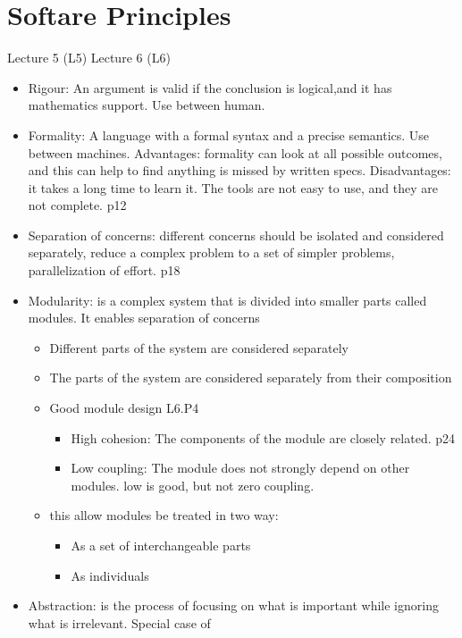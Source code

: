 \documentclass[12pt]{article}
\begin{document}
\section{Softare Principles}
Lecture 5 (L5)
Lecture 6 (L6)
\begin{itemize}
    \item Rigour: An argument is valid if the conclusion is logical,and it has mathematics support. Use between human.
    \item Formality: A language with a formal syntax and a precise semantics. Use between machines. 
    Advantages: formality can look at all possible outcomes, and this can help to find anything is missed by written specs.
    Disadvantages: it takes a long time to learn it. The tools are not easy to use, and they are not complete. p12
    \item Separation of concerns: different concerns should be isolated and considered separately, 
    reduce a complex problem to a set of simpler problems, parallelization of effort. p18
    \item Modularity: is a complex system that is divided into smaller parts called modules. It enables separation of concerns
    \begin{itemize}
        \item Different parts of the system are considered separately
        \item The parts of the system are considered separately from their composition
        \item Good module design L6.P4
        \begin{itemize}
            \item High cohesion: The components of the module are closely related. p24
            \item Low coupling: The module does not strongly depend on other modules. low is good, but not zero coupling.
        \end{itemize}
        \item this allow modules be treated in two way:
        \begin{itemize}
            \item As a set of interchangeable parts
            \item As individuals
        \end{itemize}
    \end{itemize}
    \item Abstraction: is the process of focusing on what is important while ignoring what is irrelevant. Special case of 

\end{itemize}
\end{document}
